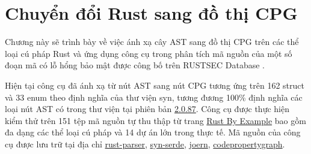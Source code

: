 \chapter{Chuyển đổi Rust sang đồ thị CPG}
\label{chap:experiment}

Chương này sẽ trình bày về việc ánh xạ cây AST sang đồ thị CPG trên các thể loại cú pháp Rust và ứng dụng công cụ trong phân tích mã nguồn của một số đoạn mã có lỗ hổng bảo mật được công bố trên RUSTSEC Database \cite{rustsecAboutRustSec}.


Hiện tại công cụ đã ánh xạ từ nút AST sang nút CPG tương ứng trên 162 struct và 33 enum theo định nghĩa của thư viện syn, tương đương 100\% định nghĩa các loại nút AST có trong thư viện tại phiên bản \href{https://docs.rs/syn/2.0.87/syn/}{2.0.87}.
Công cụ được thực hiện kiểm thử trên 151 tệp mã nguồn tự thu thập từ trang \href{https://doc.rust-lang.org/stable/rust-by-example/index.html}{Rust By Example} bao gồm đa dạng các thể loại cú pháp và 14 dự án lớn trong thực tế.
Mã nguồn của công cụ được lưu trữ tại địa chỉ \href{https://github.com/congnghiahieu/rust-parser}{rust-parser}, \href{https://github.com/congnghiahieu/syn-serde}{syn-serde}, \href{https://github.com/congnghiahieu/joern}{joern}, \href{https://github.com/congnghiahieu/codepropertygraph}{codepropertygraph}.




